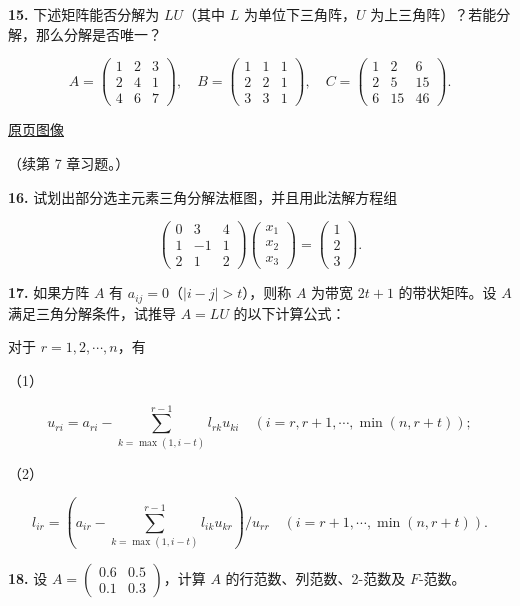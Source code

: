 \documentclass[
  10pt,
  fontset=fandol]{ctexart}
\begin{document}
\textbf{15.} 下述矩阵能否分解为 \(LU\)（其中 \(L\) 为单位下三角阵，\(U\) 为上三角阵）？若能分解，那么分解是否唯一？

\[
A=\begin{pmatrix}1&2&3\\2&4&1\\4&6&7\end{pmatrix},\quad
B=\begin{pmatrix}1&1&1\\2&2&1\\3&3&1\end{pmatrix},\quad
C=\begin{pmatrix}1&2&6\\2&5&15\\6&15&46\end{pmatrix}.
\]

\href{../../source-images/pdf-214.jpeg}{原页图像}

（续第 7 章习题。）

\textbf{16.} 试划出部分选主元素三角分解法框图，并且用此法解方程组

\[
\begin{pmatrix}0&3&4\\1&-1&1\\2&1&2\end{pmatrix}
\begin{pmatrix}x_1\\x_2\\x_3\end{pmatrix}
=\begin{pmatrix}1\\2\\3\end{pmatrix}.
\]

\textbf{17.} 如果方阵 \(A\) 有 \(a_{ij}=0\)（\(|i-j|>t\)），则称 \(A\) 为带宽 \(2t+1\) 的带状矩阵。设 \(A\) 满足三角分解条件，试推导 \(A=LU\) 的以下计算公式：

对于 \(r=1,2,\cdots,n\)，有

（1）

\[
u_{ri}=a_{ri}-\sum_{k=\max(1,i-t)}^{r-1}l_{rk}u_{ki}\quad(i=r,r+1,\cdots,\min(n,r+t));
\]

（2）

\[
l_{ir}=\left(a_{ir}-\sum_{k=\max(1,i-t)}^{r-1}l_{ik}u_{kr}\right)/u_{rr}\quad(i=r+1,\cdots,\min(n,r+t)).
\]

\textbf{18.} 设 \(A=\begin{pmatrix}0.6&0.5\\0.1&0.3\end{pmatrix}\)，计算 \(A\) 的行范数、列范数、2-范数及 \(F\)-范数。
\end{document}
